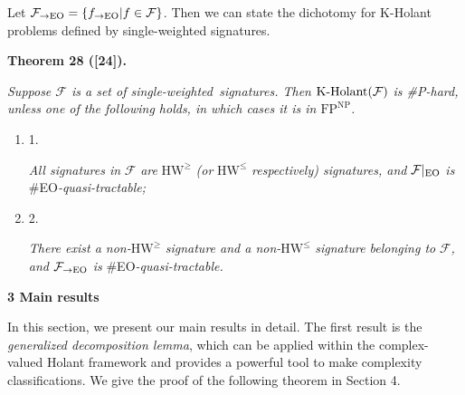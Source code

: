 Let $\mathcal{F}_{\to\textup{{EO}}}=\{f_{\to\textup{{EO}}}|f\in\mathcal{F}\}$. Then we can state the dichotomy for K-Holant problems defined by single-weighted signatures.\par





\par\medskip\noindent\textbf{
\textbf{Theorem 28}\textbf{ }([24])\textbf{.}
}\par



\emph{Suppose $\mathcal{F}$ is a set of single-weighted signatures. Then $\textup{{K-Holant}}(\mathcal{F})$ is \#P-hard, unless one of the following holds, in which cases it is in $\text{FP}^{\text{NP}}$.}\par


\begin{enumerate}


\item[] 
1. 


\emph{All signatures in }$\mathcal{F}$\emph{ are }$\text{HW}^{\geq}$\emph{ (or }$\text{HW}^{\leq}$\emph{ respectively) signatures, and }$\mathcal{F}|_{\textup{{EO}}}$\emph{ is }\#EO\emph{-quasi-tractable;}\par





\item[] 
2. 


\emph{There exist a non-}$\text{HW}^{\geq}$\emph{ signature and a non-}$\text{HW}^{\leq}$\emph{ signature belonging to }$\mathcal{F}$\emph{, and }$\mathcal{F}_{\to\textup{{EO}}}$\emph{ is }\#EO\emph{-quasi-tractable.}\par





\end{enumerate}









\par\medskip\noindent\textbf{
3 Main results}\par




In this section, we present our main results in detail. The first result is the \emph{generalized decomposition lemma}, which can be applied within the complex-valued Holant framework and provides a powerful tool to make complexity classifications. We give the proof of the following theorem in Section 4.\par




